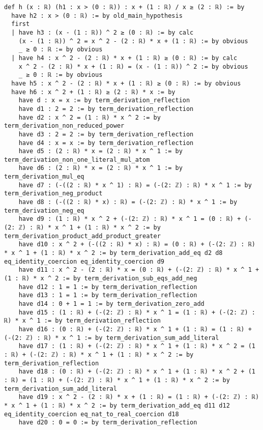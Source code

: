 \documentclass{article}
\begin{document}
\begin{tcolorbox}[colback=white!10, width=\linewidth]
\begin{lstlisting}[language=Lean4]
def h (x : ℝ) (h1 : x > (0 : ℝ)) : x + (1 : ℝ) / x ≥ (2 : ℝ) := by
  have h2 : x > (0 : ℝ) := by old_main_hypothesis
  first
  | have h3 : (x - (1 : ℝ)) ^ 2 ≥ (0 : ℝ) := by calc
    (x - (1 : ℝ)) ^ 2 = x ^ 2 - (2 : ℝ) * x + (1 : ℝ) := by obvious
    _ ≥ 0 : ℝ := by obvious
  | have h4 : x ^ 2 - (2 : ℝ) * x + (1 : ℝ) ≥ (0 : ℝ) := by calc
    x ^ 2 - (2 : ℝ) * x + (1 : ℝ) = (x - (1 : ℝ)) ^ 2 := by obvious
    _ ≥ 0 : ℝ := by obvious
  have h5 : x ^ 2 - (2 : ℝ) * x + (1 : ℝ) ≥ (0 : ℝ) := by obvious
  have h6 : x ^ 2 + (1 : ℝ) ≥ (2 : ℝ) * x := by
    have d : x = x := by term_derivation_reflection
    have d1 : 2 = 2 := by term_derivation_reflection
    have d2 : x ^ 2 = (1 : ℝ) * x ^ 2 := by term_derivation_non_reduced_power
    have d3 : 2 = 2 := by term_derivation_reflection
    have d4 : x = x := by term_derivation_reflection
    have d5 : (2 : ℝ) * x = (2 : ℝ) * x ^ 1 := by term_derivation_non_one_literal_mul_atom
    have d6 : (2 : ℝ) * x = (2 : ℝ) * x ^ 1 := by term_derivation_mul_eq
    have d7 : (-((2 : ℝ) * x ^ 1) : ℝ) = (-(2: ℤ) : ℝ) * x ^ 1 := by term_derivation_neg_product
    have d8 : (-((2 : ℝ) * x) : ℝ) = (-(2: ℤ) : ℝ) * x ^ 1 := by term_derivation_neg_eq
    have d9 : (1 : ℝ) * x ^ 2 + (-(2: ℤ) : ℝ) * x ^ 1 = (0 : ℝ) + (-(2: ℤ) : ℝ) * x ^ 1 + (1 : ℝ) * x ^ 2 := by term_derivation_product_add_product_greater
    have d10 : x ^ 2 + (-((2 : ℝ) * x) : ℝ) = (0 : ℝ) + (-(2: ℤ) : ℝ) * x ^ 1 + (1 : ℝ) * x ^ 2 := by term_derivation_add_eq d2 d8 eq_identity_coercion eq_identity_coercion d9
    have d11 : x ^ 2 - (2 : ℝ) * x = (0 : ℝ) + (-(2: ℤ) : ℝ) * x ^ 1 + (1 : ℝ) * x ^ 2 := by term_derivation_sub_eqs_add_neg
    have d12 : 1 = 1 := by term_derivation_reflection
    have d13 : 1 = 1 := by term_derivation_reflection
    have d14 : 0 + 1 = 1 := by term_derivation_zero_add
    have d15 : (1 : ℝ) + (-(2: ℤ) : ℝ) * x ^ 1 = (1 : ℝ) + (-(2: ℤ) : ℝ) * x ^ 1 := by term_derivation_reflection
    have d16 : (0 : ℝ) + (-(2: ℤ) : ℝ) * x ^ 1 + (1 : ℝ) = (1 : ℝ) + (-(2: ℤ) : ℝ) * x ^ 1 := by term_derivation_sum_add_literal
    have d17 : (1 : ℝ) + (-(2: ℤ) : ℝ) * x ^ 1 + (1 : ℝ) * x ^ 2 = (1 : ℝ) + (-(2: ℤ) : ℝ) * x ^ 1 + (1 : ℝ) * x ^ 2 := by term_derivation_reflection
    have d18 : (0 : ℝ) + (-(2: ℤ) : ℝ) * x ^ 1 + (1 : ℝ) * x ^ 2 + (1 : ℝ) = (1 : ℝ) + (-(2: ℤ) : ℝ) * x ^ 1 + (1 : ℝ) * x ^ 2 := by term_derivation_sum_add_literal
    have d19 : x ^ 2 - (2 : ℝ) * x + (1 : ℝ) = (1 : ℝ) + (-(2: ℤ) : ℝ) * x ^ 1 + (1 : ℝ) * x ^ 2 := by term_derivation_add_eq d11 d12 eq_identity_coercion eq_nat_to_real_coercion d18
    have d20 : 0 = 0 := by term_derivation_reflection

\end{lstlisting}
\end{tcolorbox}
\end{document}
